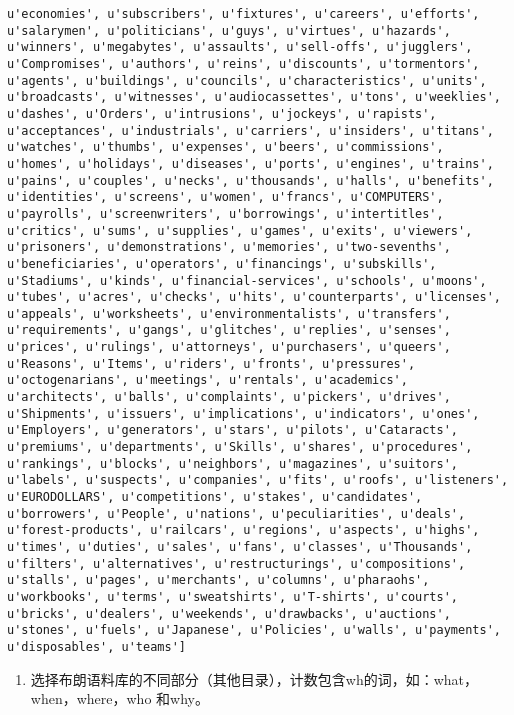 \documentclass{article}
\providecommand{\tightlist}{%
      \setlength{\itemsep}{0pt}\setlength{\parskip}{0pt}}
\begin{document}
\begin{Verbatim}[commandchars=\\\{\}]
u'economies', u'subscribers', u'fixtures', u'careers', u'efforts', u'salarymen', u'politicians', u'guys', u'virtues', u'hazards', u'winners', u'megabytes', u'assaults', u'sell-offs', u'jugglers', u'Compromises', u'authors', u'reins', u'discounts', u'tormentors', u'agents', u'buildings', u'councils', u'characteristics', u'units', u'broadcasts', u'witnesses', u'audiocassettes', u'tons', u'weeklies', u'dashes', u'Orders', u'intrusions', u'jockeys', u'rapists', u'acceptances', u'industrials', u'carriers', u'insiders', u'titans', u'watches', u'thumbs', u'expenses', u'beers', u'commissions', u'homes', u'holidays', u'diseases', u'ports', u'engines', u'trains', u'pains', u'couples', u'necks', u'thousands', u'halls', u'benefits', u'identities', u'screens', u'women', u'francs', u'COMPUTERS', u'payrolls', u'screenwriters', u'borrowings', u'intertitles', u'critics', u'sums', u'supplies', u'games', u'exits', u'viewers', u'prisoners', u'demonstrations', u'memories', u'two-sevenths', u'beneficiaries', u'operators', u'financings', u'subskills', u'Stadiums', u'kinds', u'financial-services', u'schools', u'moons', u'tubes', u'acres', u'checks', u'hits', u'counterparts', u'licenses', u'appeals', u'worksheets', u'environmentalists', u'transfers', u'requirements', u'gangs', u'glitches', u'replies', u'senses', u'prices', u'rulings', u'attorneys', u'purchasers', u'queers', u'Reasons', u'Items', u'riders', u'fronts', u'pressures', u'octogenarians', u'meetings', u'rentals', u'academics', u'architects', u'balls', u'complaints', u'pickers', u'drives', u'Shipments', u'issuers', u'implications', u'indicators', u'ones', u'Employers', u'generators', u'stars', u'pilots', u'Cataracts', u'premiums', u'departments', u'Skills', u'shares', u'procedures', u'rankings', u'blocks', u'neighbors', u'magazines', u'suitors', u'labels', u'suspects', u'companies', u'fits', u'roofs', u'listeners', u'EURODOLLARS', u'competitions', u'stakes', u'candidates', u'borrowers', u'People', u'nations', u'peculiarities', u'deals', u'forest-products', u'railcars', u'regions', u'aspects', u'highs', u'times', u'duties', u'sales', u'fans', u'classes', u'Thousands', u'filters', u'alternatives', u'restructurings', u'compositions', u'stalls', u'pages', u'merchants', u'columns', u'pharaohs', u'workbooks', u'terms', u'sweatshirts', u'T-shirts', u'courts', u'bricks', u'dealers', u'weekends', u'drawbacks', u'auctions', u'stones', u'fuels', u'Japanese', u'Policies', u'walls', u'payments', u'disposables', u'teams']
    \end{Verbatim}

    \begin{enumerate}
\def\labelenumi{(\arabic{enumi})}
\setcounter{enumi}{1}
\tightlist
\item
  选择布朗语料库的不同部分（其他目录），计数包含wh的词，如：what，when，where，who
  和why。
\end{enumerate}
\end{document}

